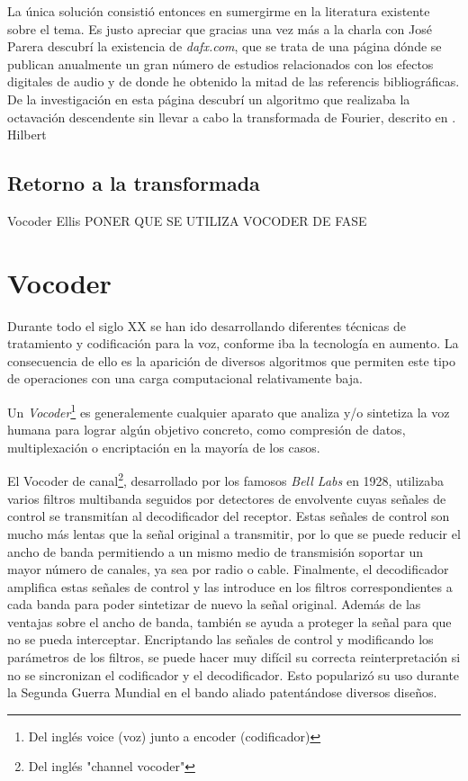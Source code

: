 La única solución consistió entonces en sumergirme en la literatura existente sobre el tema. Es justo apreciar que gracias una vez más a la charla con José Parera descubrí la existencia de \emph{dafx.com}, que se trata de una página dónde se publican anualmente un gran número de estudios relacionados con los efectos digitales de audio y de donde he obtenido la mitad de las referencis bibliográficas. De la investigación en esta página descubrí un algoritmo que realizaba la octavación descendente sin llevar a cabo la transformada de Fourier, descrito en \cite{nfctsm}.
Hilbert
\subsection{Retorno a la transformada}
Vocoder
Ellis
PONER QUE SE UTILIZA VOCODER DE FASE
\section{Vocoder}
Durante todo el siglo XX se han ido desarrollando diferentes técnicas de tratamiento y codificación para la voz, conforme iba la tecnología en aumento. La consecuencia de ello es la aparición de diversos algoritmos que permiten este tipo de operaciones con una carga computacional relativamente baja. 

Un \emph{Vocoder}\footnote{Del inglés voice (voz) junto a encoder (codificador)} es generalemente cualquier aparato que analiza y/o sintetiza la voz humana para lograr algún objetivo concreto, como compresión de datos, multiplexación o encriptación en la mayoría de los casos.

El Vocoder de canal\footnote{Del inglés "channel vocoder"}, desarrollado por los famosos \emph{Bell Labs} en 1928, utilizaba varios filtros multibanda seguidos por detectores de envolvente cuyas señales de control se transmitían al decodificador del receptor. Estas señales de control son mucho más lentas que la señal original a transmitir, por lo que se puede reducir el ancho de banda permitiendo a un mismo medio de transmisión soportar un mayor número de canales, ya sea por radio o cable. Finalmente, el decodificador amplifica estas señales de control y las introduce en los filtros correspondientes a cada banda para poder sintetizar de nuevo la señal original. Además de las ventajas sobre el ancho de banda, también se ayuda a proteger la señal para que no se pueda interceptar. Encriptando las señales de control y modificando los parámetros de los filtros, se puede hacer muy difícil su correcta reinterpretación si no se sincronizan el codificador y el decodificador. Esto popularizó su uso durante la Segunda Guerra Mundial en el bando aliado patentándose diversos diseños.

